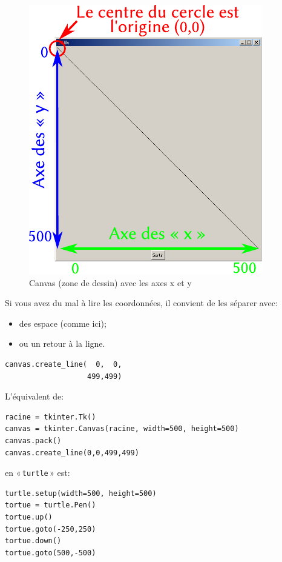 \begin{figure}[h!t]
\centering
\includegraphics[scale=1]{images/diag}
\caption{Canvas (zone de dessin) avec les axes x et y}\label{fig:diag}
\end{figure}

Si vous avez du mal à lire les coordonnées, il convient de les séparer avec:
\begin{itemize}
\item des espace (comme ici);
\item ou un retour à la ligne.
\end{itemize}

\begin{Verbatim}[frame=single,rulecolor=\color{gray}, label=exemple]
canvas.create_line(  0,  0, 
                   499,499)
\end{Verbatim}

L'équivalent de:
\begin{Verbatim}[frame=single,rulecolor=\color{gray}, label=ne pas taper]
racine = tkinter.Tk()
canvas = tkinter.Canvas(racine, width=500, height=500)
canvas.pack()
canvas.create_line(0,0,499,499)
\end{Verbatim}
en « \texttt{turtle} » est: 
\begin{Verbatim}[frame=single,rulecolor=\color{gray}, label=ne pas taper]
turtle.setup(width=500, height=500)
tortue = turtle.Pen()
tortue.up()
tortue.goto(-250,250)
tortue.down()
tortue.goto(500,-500)
\end{Verbatim}

